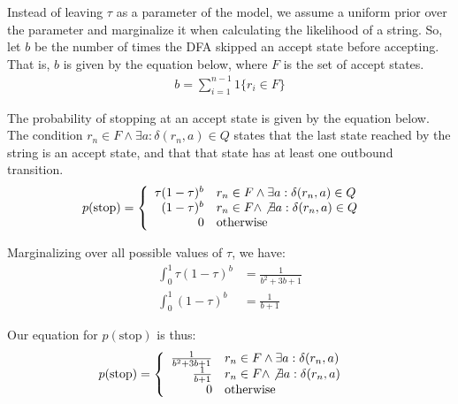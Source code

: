 \documentclass[10pt,letterpaper]{article}
\begin{document}
Instead of leaving $\tau$ as a parameter of the model, we assume a uniform prior over the parameter and marginalize it when calculating the likelihood of a string. So, let $b$ be the number of times the DFA skipped an accept state before accepting. That is, $b$ is given by the equation below, where $F$ is the set of accept states.
\begin{align*}
	b = \sum_{i=1}^{n-1} 1 \{ r_i \in F\}
\end{align*}


The probability of stopping at an accept state is given by the equation below. The condition $r_n \in F \wedge \exists a : \delta(r_n, a)\in Q$ states that the last state reached by the string is an accept state, and that that state has at least one outbound transition.
\begin{align*}
	p(\text{stop}) &= \left\{
		\begin{array}{rl}
		\tau (1-\tau)^b & r_n \in F \wedge \exists a : \delta(r_n, a)\in Q
		\\ (1-\tau)^b & r_n \in F \wedge \not \exists a : \delta(r_n, a)\in Q
		\\ 0 & \text{otherwise}
		\end{array}
		\right.
\end{align*}

Marginalizing over all possible values of $\tau$, we have:
\begin{align*}
	\int_0^1 \tau (1-\tau)^b &= \frac{1}{b^2+3b+1}
	\\ \int_0^1 (1-\tau)^b &= \frac{1}{b+1}
\end{align*}

Our equation for $p(\text{stop})$ is thus:
\begin{align*}
	p(\text{stop}) &= \left\{
		\begin{array}{rl}
		\frac{1}{b^2+3b+1} & r_n \in F \wedge \exists a : \delta(r_n, a)
		\\ \frac{1}{b+1} & r_n \in F \wedge \not \exists a : \delta(r_n, a)
		\\ 0 & \text{otherwise}
		\end{array}
		\right.
\end{align*}
\end{document}
